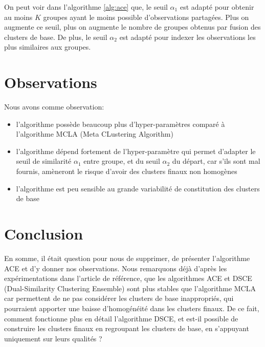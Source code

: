 \documentclass[12pt, french, latin.medieval, a4paper]{report}
\begin{document}
	On peut voir dans l'algorithme \ref{alg:ace} que, le seuil $\alpha_1$ est adapté pour obtenir au moins $K$ groupes ayant le moins possible d'observations partagées.
	Plus on augmente ce seuil, plus on augmente le nombre de groupes obtenus par fusion des clusters de base.
	De plus, le seuil $\alpha_2$ est adapté pour indexer les observations les plus similaires aux groupes.
    

	\section{Observations}
	Nous avons comme observation:
	\begin{itemize}
    	\item l'algorithme possède beaucoup plus d'hyper-paramètres comparé à l'algorithme MCLA (Meta CLustering Algorithm) \cite{strehl2002cluster}
    	\item l'algorithme dépend fortement de l'hyper-paramètre qui permet d'adapter le seuil de similarité $\alpha_1$ entre groupe, et du seuil $\alpha_2$ du départ, car s'ils sont mal fournis, amèneront le risque d'avoir des clusters finaux non homogènes
    	\item l'algorithme est peu sensible au grande variabilité de constitution des clusters de base
	\end{itemize}

	\section{ Conclusion }
	En somme, il était question pour nous de supprimer, de présenter l'algorithme ACE et d'y donner nos observations.
	Nous remarquons déjà d'après les expérimentations dans l'article de référence, que les algorithmes ACE et DSCE (Dual-Similarity Clustering Ensemble) sont plus stables que l'algorithme MCLA car permettent de ne pas considérer les clusters de base inappropriés,
	qui pourraient apporter une baisse d'homogénéité dans les clusters finaux.
	De ce fait, comment fonctionne plus en détail l'algorithme DSCE, et est-il possible de construire les clusters finaux en regroupant les clusters de base, en s'appuyant uniquement sur leurs qualités ?


	
\end{document}
